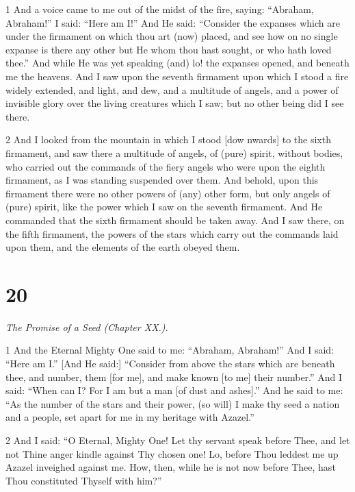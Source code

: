 \par 1 And a voice came to me out of the midst of the fire, saying: “Abraham, Abraham!” I said: “Here am I!” And He said: “Consider the expanses which are under the firmament on which thou art (now) placed, and see how on no single expanse is there any other but He whom thou hast sought, or who hath loved thee.” And while He was yet speaking (and) lo! the expanses opened, and beneath me the heavens. And I saw upon the seventh firmament upon which I stood a fire widely extended, and light, and dew, and a multitude of angels, and a power of invisible glory over the living creatures which I saw; but no other being did I see there. 

\par 2 And I looked from the mountain in which I stood [dow nwards] to the sixth firmament, and saw there a multitude of angels, of (pure) spirit, without bodies, who carried out the commands of the fiery angels who were upon the eighth firmament, as I was standing suspended over them. And behold, upon this firmament there were no other powers of (any) other form, but only angels of (pure) spirit, like the power which I saw on the seventh firmament. And He commanded that the sixth firmament should be taken away. And I saw there, on the fifth firmament, the powers of the stars which carry out the commands laid upon them, and the elements of the earth obeyed them. 

\chapter{20}

\par \textit{The Promise of a Seed (Chapter XX.).}

\par 1 And the Eternal Mighty One said to me: “Abraham, Abraham!” And I said: “Here am I.” [And He said:] “Consider from above the stars which are beneath thee, and number, them [for me], and make known [to me] their number.” And I said: “When can I? For I am but a man [of dust and ashes].” And he said to me: “As the number of the stars and their power, (so will) I make thy seed a nation and a people, set apart for me in my heritage with Azazel.”

\par 2 And I said: “O Eternal, Mighty One! Let thy servant speak before Thee, and let not Thine anger kindle against Thy chosen one! Lo, before Thou leddest me up Azazel inveighed against me. How, then, while he is not now before Thee, hast Thou constituted Thyself with him?”

